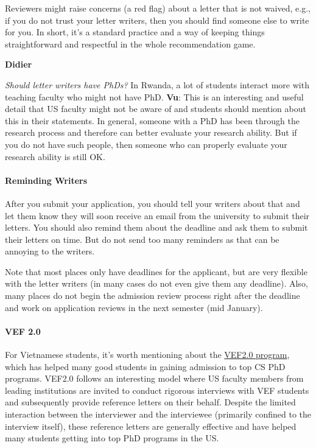 \documentclass[oneside,11pt,dvipsnames]{book}
\newenvironment{commentbox}[1][]{
  \small
  \begin{mybox}
    {\small \textbf{#1}}
  }{
  \end{mybox}
}
\begin{document}
Reviewers might raise concerns (a red flag) about  a letter that is not waived, e.g., if you do not trust your letter writers, then you should find someone else to write for you. In short, it's a standard practice and a way of keeping things straightforward and respectful in the whole recommendation game.

\begin{commentbox}[Didier]
  \emph{Should letter writers have PhDs?}  In Rwanda, a lot of students interact more with teaching faculty who might not have PhD.
  \tcblower
  \textbf{Vu}: This is an interesting and useful detail that US faculty might not be aware of and students should mention about this in their statements. In general, someone with a PhD has been through the research process and therefore can better evaluate your research ability.  But if you do not have such people, then someone who can properly evaluate your research ability is still OK.
\end{commentbox}

\paragraph{Reminding Writers} After you submit your application, you should tell your writers about that and let them know they will soon receive an email from the university to submit their letters.  You should also remind them about the deadline and ask them to submit their letters on time.  But do not send too many reminders as that can be annoying to the writers.

Note that most places only have deadlines for the applicant, but are very flexible with the letter writers (in many cases do not even give them any deadline).  Also, many places do not begin the admission review process right after the deadline and work on application reviews in the next semester (mid January).


\paragraph{VEF 2.0} For Vietnamese students, it's worth mentioning about the \href{https://vef2.org/}{VEF2.0 program}, which has helped many good students in gaining admission to top CS PhD programs. VEF2.0 follows an interesting model where US faculty members from leading institutions are invited to conduct rigorous interviews with VEF students and subsequently provide reference letters on their behalf. Despite the limited interaction between the interviewer and the interviewee (primarily confined to the interview itself), these reference letters are generally effective and have helped many students getting into top PhD programs in the US.
\end{document}
